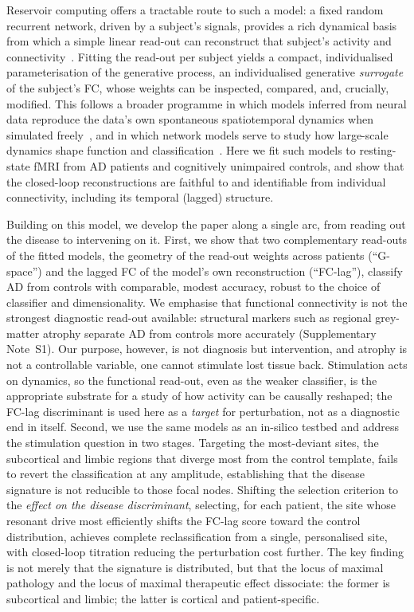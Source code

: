 \documentclass[11pt]{article}
\begin{document}
Reservoir computing offers a tractable route to such a model: a fixed random
recurrent network, driven by a subject's signals, provides a rich dynamical
basis from which a simple linear read-out can reconstruct that subject's
activity and connectivity~\cite{jaeger2001,maass2002}. Fitting the
read-out per subject yields a compact, individualised parameterisation of the
generative process, an individualised generative \emph{surrogate} of the
subject's FC, whose weights can be inspected, compared, and, crucially, modified.
This follows a broader programme in which models inferred from neural data
reproduce the data's own spontaneous spatiotemporal dynamics when simulated
freely~\cite{capone2018spont,capone2023simdata}, and in which network models
serve to study how large-scale dynamics shape function and
classification~\cite{capone2019slowosc}. Here we fit such models to
resting-state fMRI from AD patients and cognitively unimpaired controls, and
show that the closed-loop reconstructions are faithful to and identifiable from
individual connectivity, including its temporal (lagged) structure.

Building on this model, we develop the paper along a single arc, from reading
out the disease to intervening on it. First, we show that two complementary
read-outs of the fitted models, the geometry of the read-out weights across patients (``G-space'') and the lagged FC of the model's own reconstruction (``FC-lag''), classify AD from controls with comparable, modest accuracy, robust to the choice of classifier
and dimensionality. We emphasise that functional connectivity is not the
strongest diagnostic read-out available: structural markers such as regional
grey-matter atrophy separate AD from controls more accurately
(Supplementary Note~S1). Our purpose, however,
is not diagnosis but intervention, and atrophy is not a controllable variable,
one cannot stimulate lost tissue back. Stimulation acts on dynamics, so the
functional read-out, even as the weaker classifier, is the appropriate substrate
for a study of how activity can be causally reshaped; the FC-lag discriminant is
used here as a \emph{target} for perturbation, not as a diagnostic end in itself.
Second, we use the same models as an in-silico testbed and
address the stimulation question in two stages. Targeting the most-deviant
sites, the subcortical and limbic regions that diverge most from the control
template, fails to revert the classification at any amplitude, establishing that
the disease signature is not reducible to those focal nodes. Shifting the
selection criterion to the \emph{effect on the disease discriminant}, selecting,
for each patient, the site whose resonant drive most efficiently shifts the FC-lag
score toward the control distribution, achieves complete reclassification from a
single, personalised site, with closed-loop titration reducing the perturbation
cost further. The key finding is not merely that the signature is distributed,
but that the locus of maximal pathology and the locus of maximal therapeutic
effect dissociate: the former is subcortical and limbic; the latter is cortical
and patient-specific.
\end{document}
